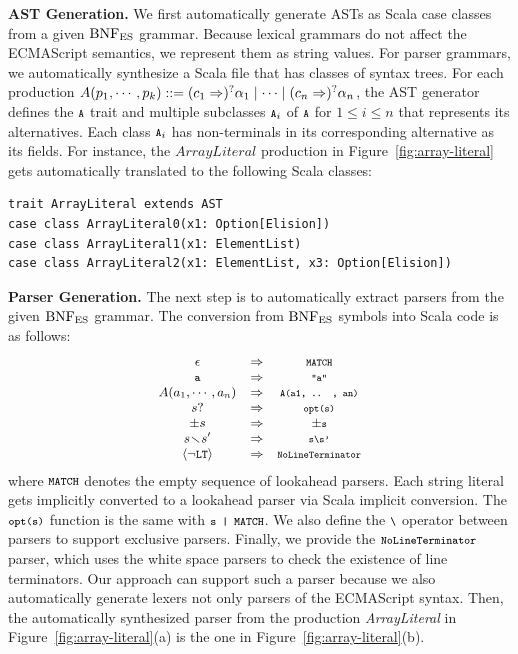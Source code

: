 \textbf{AST Generation.}
We first automatically generate ASTs as Scala case classes from a
given \( \text{BNF}_{\text{ES}} \) grammar.  Because lexical grammars do not affect
the ECMAScript semantics, we represent them as string values.
For parser grammars, we automatically synthesize a Scala file that has
classes of syntax trees.  For each production \(
  A(p_1, \cdots, p_k) ::=
  (c_1 \Rightarrow)^? \alpha_1 \mid
  \cdots \mid
  (c_n \Rightarrow)^? \alpha_n
\), the AST generator defines the \( \texttt{\footnotesize A} \) trait and multiple
subclasses \( \texttt{\footnotesize A}_i \) of \( \texttt{\footnotesize A} \) for \(1 \le i \le n\)
that represents its alternatives.  Each class \( \texttt{\footnotesize A}_i \) has
non-terminals in its corresponding alternative as its fields.
For instance, the \( ArrayLiteral \) production in Figure~\ref{fig:array-literal}
gets automatically translated to the following Scala classes:
\begin{lstlisting}[style=smallScalastyle]
trait ArrayLiteral extends AST
case class ArrayLiteral0(x1: Option[Elision])
case class ArrayLiteral1(x1: ElementList)
case class ArrayLiteral2(x1: ElementList, x3: Option[Elision])
\end{lstlisting}

\smallskip

\textbf{Parser Generation.}
The next step is to automatically extract parsers from the given \(
\text{BNF}_{\text{ES}} \) grammar.  The conversion from \( \text{BNF}_{\text{ES}} \) symbols into
Scala code is as follows:
\[
\small
  \begin{array}{ccc}
    \epsilon &\Rightarrow& \texttt{\scriptsize MATCH}\\
    \texttt{\footnotesize a} &\Rightarrow& \texttt{\scriptsize"a"}\\
    A(a_1, \cdots, a_n) &\Rightarrow& \texttt{\scriptsize A(a1, .. , an)}\\
    s? &\Rightarrow& \texttt{\scriptsize opt(s)}\\
    \pm s &\Rightarrow& \pm\texttt{\scriptsize s} \\
    s \!\smallsetminus\! s' &\Rightarrow& \texttt{\scriptsize s\textbackslash s'}\\
    \left<\neg\texttt{\footnotesize LT}\right> &\Rightarrow& \texttt{\scriptsize NoLineTerminator}\\
  \end{array}
\]
where \( \texttt{\footnotesize MATCH} \) denotes the empty sequence of lookahead parsers.
Each string literal gets implicitly converted to a lookahead parser via
Scala implicit conversion.  The \( \texttt{\footnotesize opt(s)} \) function is the
same with \( \texttt{\footnotesize s | MATCH} \).  We also define the \( \texttt{\footnotesize\textbackslash} \) 
operator between parsers to support exclusive parsers.
Finally, we provide the \( \texttt{\footnotesize NoLineTerminator} \) parser, which uses
the white space parsers to check the existence of line terminators.
Our approach can support such a parser because we also automatically
generate lexers not only parsers of the ECMAScript syntax.  Then, the 
automatically synthesized parser from the production \textit{ArrayLiteral}
in Figure~\ref{fig:array-literal}(a) is the one in Figure~\ref{fig:array-literal}(b).

